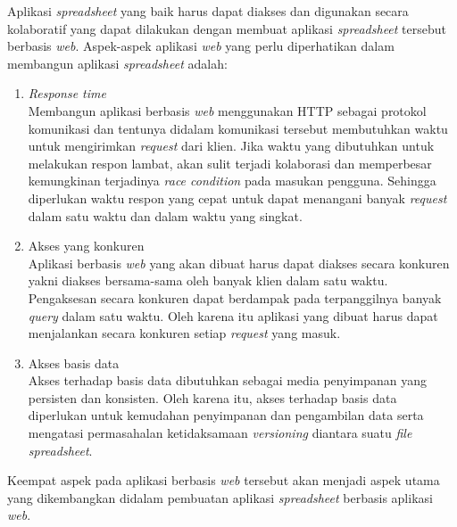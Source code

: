 Aplikasi \textit{spreadsheet} yang baik harus dapat diakses dan digunakan secara kolaboratif yang dapat dilakukan dengan membuat aplikasi \textit{spreadsheet} tersebut berbasis \textit{web}. Aspek-aspek aplikasi \textit{web} yang perlu diperhatikan dalam membangun aplikasi \textit{spreadsheet} adalah:
\begin{enumerate}
	\item \textit{Response time}\\
	Membangun aplikasi berbasis \textit{web} menggunakan HTTP sebagai protokol komunikasi dan tentunya didalam komunikasi tersebut membutuhkan waktu untuk mengirimkan \textit{request} dari klien. Jika waktu yang dibutuhkan untuk melakukan respon lambat, akan sulit terjadi kolaborasi dan memperbesar kemungkinan terjadinya \textit{race condition} pada masukan pengguna. Sehingga diperlukan waktu respon yang cepat untuk dapat menangani banyak \textit{request} dalam satu waktu dan dalam waktu yang singkat.

	\item Akses yang konkuren\\
	Aplikasi berbasis \textit{web} yang akan dibuat harus dapat diakses secara konkuren yakni diakses bersama-sama oleh banyak klien dalam satu waktu. Pengaksesan secara konkuren dapat berdampak pada terpanggilnya banyak \textit{query} dalam satu waktu. Oleh karena itu aplikasi yang dibuat harus dapat menjalankan secara konkuren setiap \textit{request} yang masuk.

	\item Akses basis data\\
	Akses terhadap basis data dibutuhkan sebagai media penyimpanan yang persisten dan konsisten. Oleh karena itu, akses terhadap basis data diperlukan untuk kemudahan penyimpanan dan pengambilan data serta mengatasi permasahalan ketidaksamaan \textit{versioning} diantara suatu \textit{file spreadsheet}.

\end{enumerate}

Keempat aspek pada aplikasi berbasis \textit{web} tersebut akan menjadi aspek utama yang dikembangkan didalam pembuatan aplikasi \textit{spreadsheet} berbasis aplikasi \textit{web}.

